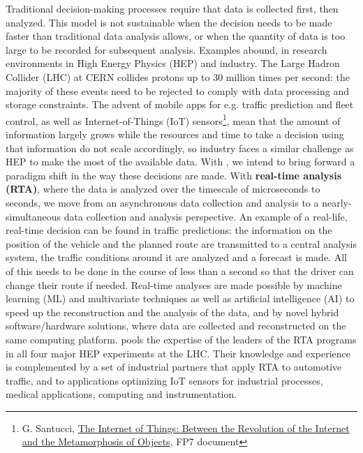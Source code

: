 Traditional decision-making processes require that data is collected first, then analyzed.
This model is not sustainable when the decision needs to be made faster than traditional data analysis allows, or when the quantity of data is too large to be recorded for subsequent analysis. 
Examples abound, in research environments in High Energy Physics (HEP) and industry. 
The Large Hadron Collider (LHC) at CERN collides protons up to 30 million times per second: the majority of these events need to be rejected to comply with data processing and storage constraints. 
The advent of mobile apps for e.g. traffic prediction and fleet control, as well as Internet-of-Things (IoT) sensors\footnote{G. Santucci, \href{http://cordis.europa.eu/fp7/ict/enet/documents/publications/iot-between-the-internet-revolution.pdf}{The Internet of Things: Between the Revolution of the Internet and the Metamorphosis of Objects}, FP7 document}, mean that the amount of information largely grows while the resources and time to take a decision using that information do not scale accordingly, so industry faces a similar challenge as HEP to make the most of the available data. 
\vskip2pt
With \acronym, we intend to bring forward a paradigm shift in the way these decisions are made. With \textbf{real-time analysis (RTA)}, where the data is analyzed over the timescale of microseconds to seconds, we move from an asynchronous data collection and analysis to a nearly-simultaneous data collection and analysis perspective.
An example of a real-life, real-time decision can be found in traffic predictions: the information on the position of the vehicle and the planned route are transmitted to a central analysis system, the traffic conditions around it are analyzed and a forecast is made. 
All of this needs to be done in the course of less than a second so that the driver can change their route if needed. 
Real-time analyses are made possible by machine learning (ML) and multivariate techniques as well as artificial intelligence (AI) to speed up the reconstruction and the analysis of the data, and by novel hybrid software/hardware solutions, where data are collected and reconstructed on the same computing platform. 
\vskip2pt
\acronym pools the expertise of the leaders of the RTA programs in all four major HEP experiments at the LHC. 
Their knowledge and experience is complemented by a set of industrial partners that apply RTA to automotive traffic, and to applications optimizing IoT sensors for industrial processes, medical applications, computing and instrumentation. 
